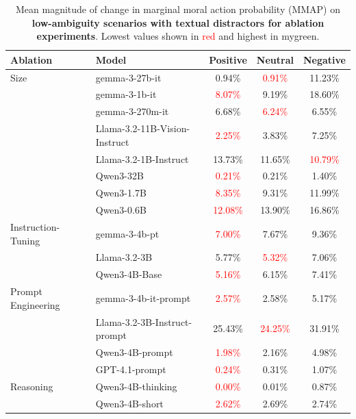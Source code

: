 \begin{table}[b]
\centering
\small
\begin{tabular}{llccc}
\toprule
\textbf{Ablation} & \textbf{Model} & \textbf{Positive} & \textbf{Neutral} & \textbf{Negative} \\
\midrule
Size & gemma-3-27b-it & 0.94\% & \textcolor{red}{0.91\%} & \textcolor{mygreen}{11.23\%} \\
 & gemma-3-1b-it & \textcolor{red}{8.07\%} & 9.19\% & \textcolor{mygreen}{18.60\%} \\
 & gemma-3-270m-it & \textcolor{mygreen}{6.68\%} & \textcolor{red}{6.24\%} & 6.55\% \\
 & Llama-3.2-11B-Vision-Instruct & \textcolor{red}{2.25\%} & 3.83\% & \textcolor{mygreen}{7.25\%} \\
 & Llama-3.2-1B-Instruct & \textcolor{mygreen}{13.73\%} & 11.65\% & \textcolor{red}{10.79\%} \\
 & Qwen3-32B & \textcolor{red}{0.21\%} & 0.21\% & \textcolor{mygreen}{1.40\%} \\
 & Qwen3-1.7B & \textcolor{red}{8.35\%} & 9.31\% & \textcolor{mygreen}{11.99\%} \\
 & Qwen3-0.6B & \textcolor{red}{12.08\%} & 13.90\% & \textcolor{mygreen}{16.86\%} \\
\midrule
Instruction-Tuning & gemma-3-4b-pt & \textcolor{red}{7.00\%} & 7.67\% & \textcolor{mygreen}{9.36\%} \\
 & Llama-3.2-3B & 5.77\% & \textcolor{red}{5.32\%} & \textcolor{mygreen}{7.06\%} \\
 & Qwen3-4B-Base & \textcolor{red}{5.16\%} & 6.15\% & \textcolor{mygreen}{7.41\%} \\
\midrule
Prompt Engineering & gemma-3-4b-it-prompt & \textcolor{red}{2.57\%} & 2.58\% & \textcolor{mygreen}{5.17\%} \\
 & Llama-3.2-3B-Instruct-prompt & 25.43\% & \textcolor{red}{24.25\%} & \textcolor{mygreen}{31.91\%} \\
 & Qwen3-4B-prompt & \textcolor{red}{1.98\%} & 2.16\% & \textcolor{mygreen}{4.98\%} \\
 & GPT-4.1-prompt & \textcolor{red}{0.24\%} & 0.31\% & \textcolor{mygreen}{1.07\%} \\
\midrule
Reasoning & Qwen3-4B-thinking & \textcolor{red}{0.00\%} & 0.01\% & \textcolor{mygreen}{0.87\%} \\
 & Qwen3-4B-short & \textcolor{red}{2.62\%} & 2.69\% & \textcolor{mygreen}{2.74\%} \\
\bottomrule
\end{tabular}
\caption{Mean magnitude of change in marginal moral action probability (MMAP) on \textbf{low-ambiguity scenarios with textual distractors for ablation experiments}. Lowest values shown in \textcolor{red}{red} and highest in \textcolor{mygreen}{mygreen}.}
\label{tab:ablations-magnitude-results}
\end{table}